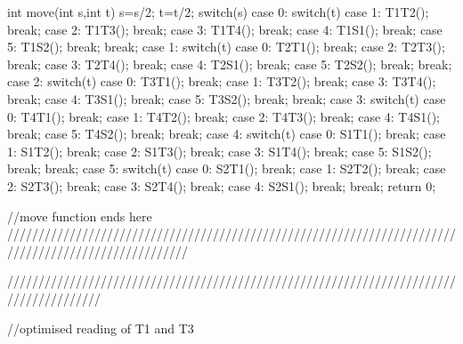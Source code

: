 int move(int s,int t)
{
	s=s/2;
	t=t/2;
	switch(s)
	{
		case 0:
			switch(t)
			{
				case 1:
					T1T2();
					break;
				case 2:
					T1T3();
					break;
				case 3:
					T1T4();
					break;
				case 4:
					T1S1();
					break;
				case 5:
					T1S2();
					break;
			}
			break;
		case 1:
			switch(t)
			{
				case 0:
					T2T1();
					break;
				case 2:
					T2T3();
					break;
				case 3:
					T2T4();
					break;
				case 4:
					T2S1();
					break;
				case 5:
					T2S2();
					break;
			}
			break;
		case 2:
			switch(t)
			{
				case 0:
					T3T1();
					break;
				case 1:
					T3T2();
					break;
				case 3:
					T3T4();
					break;
				case 4:
					T3S1();
					break;
				case 5:
					T3S2();
					break;
			}
			break;
		case 3:
			switch(t)
			{
				case 0:
					T4T1();
					break;
				case 1:
					T4T2();
					break;
				case 2:
					T4T3();
					break;
				case 4:
					T4S1();
					break;
				case 5:
					T4S2();
					break;
			}
			break;
		case 4:
			switch(t)
			{
				case 0:
					S1T1();
					break;
				case 1:
					S1T2();
					break;
				case 2:
					S1T3();
					break;
				case 3:
					S1T4();
					break;
				case 5:
					S1S2();
					break;
			}
			break;
		case 5:
			switch(t)
			{
				case 0:
					S2T1();
					break;
				case 1:
					S2T2();
					break;
				case 2:
					S2T3();
					break;
				case 3:
					S2T4();
					break;
				case 4:
					S2S1();
					break;
			}
			break;
	}
	return 0;
}

//move function ends here
/////////////////////////////////////////////////////////////////////////////////////////////////////


///////////////////////////////////////////////////////////////////////////////////////

//optimised reading of T1 and T3

